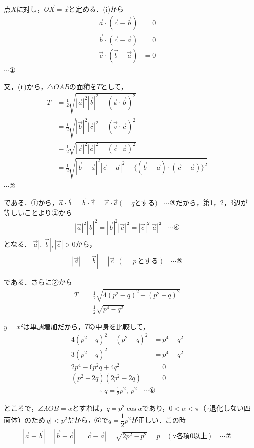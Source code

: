 \documentclass[../main.tex]{subfiles}
\begin{document}
点$X$に対し，$\overrightarrow{OX}=\vec x$と定める．(i)から
\begin{align*}
  \vec a\cdot(\vec c-\vec b)&=0\\
  \vec b\cdot(\vec c-\vec a)&=0\\
  \vec c\cdot(\vec b-\vec a)&=0
\end{align*}
$\cdots①$

又，(ii)から，$\triangle OAB$の面積を$T$として，
\begin{align*}
  T&=\frac12\sqrt{|\vec a|^2|\vec b|^2-(\vec a\cdot\vec b)^2}\\
  &=\frac12\sqrt{|\vec b|^2|\vec c|^2-(\vec b\cdot\vec c)^2}\\
  &=\frac12\sqrt{|\vec c|^2|\vec a|^2-(\vec c\cdot\vec a)^2}\\
  &=\frac12\sqrt{|\vec b-\vec a|^2|\vec c-\vec a|^2-\{(\vec b-\vec a)\cdot(\vec c-\vec a)\}^2}
\end{align*}
$\cdots②$

である．①から，$\vec a\cdot\vec b=\vec b\cdot\vec c=\vec c\cdot\vec a\ (=q$とする$)\quad\cdots③$だから，第1，2，3辺が等しいことより②から
\begin{align*}
  |\vec a|^2|\vec b|^2=|\vec b|^2|\vec c|^2=|\vec c|^2|\vec a|^2\quad\cdots④
\end{align*}
となる．$|\vec a|,|\vec b|,|\vec c|>0$から，
\begin{align*}
  |\vec a|=|\vec b|=|\vec c|\ (=p\ \text{とする})\quad\cdots⑤
\end{align*}

である．さらに②から
\begin{align*}
  T&=\frac12\sqrt{4(p^2-q)^2-(p^2-q)^2}\\
  &=\frac12\sqrt{p^4-q^2}
\end{align*}

$y=x^2$は単調増加だから，$T$の中身を比較して，
\begin{align*}
  4(p^2-q)^2-(p^2-q)^2&=p^4-q^2\\
  3(p^2-q)^2&=p^4-q^2\\
  2p^4-6p^2q+4q^2&=0\\
  (p^2-2q)(2p^2-2q)&=0
\end{align*}
\begin{align*}
  \therefore\ q=\frac12p^2,\ p^2\quad\cdots⑥
\end{align*}

ところで，$\angle AOB=\alpha$とすれば，$q=p^2\cos\alpha$であり，$0<\alpha<\pi$（$\because$退化しない四面体）のため$|q|<p^2$だから，⑥で$q=\dfrac12p^2$が正しい．この時
\begin{align*}
  |\vec a-\vec b|=|\vec b-\vec c|=|\vec c-\vec a|=\sqrt{2p^2-p^2}=p\quad(\because\text{各項}0\text{以上})\quad\cdots⑦
\end{align*}
\end{document}
